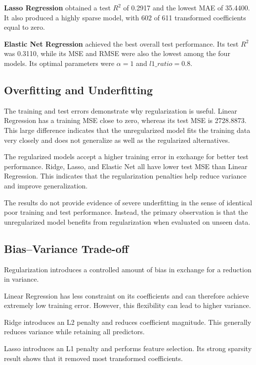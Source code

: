 \documentclass[12pt,a4paper]{article}
\begin{document}
\textbf{Lasso Regression} obtained a test $R^2$ of 0.2917 and the lowest MAE of 35.4400. It also produced a highly sparse model, with 602 of 611 transformed coefficients equal to zero.

\textbf{Elastic Net Regression} achieved the best overall test performance. Its test $R^2$ was 0.3110, while its MSE and RMSE were also the lowest among the four models. Its optimal parameters were $\alpha=1$ and $l1\_ratio=0.8$.

\subsection{Overfitting and Underfitting}

The training and test errors demonstrate why regularization is useful. Linear Regression has a training MSE close to zero, whereas its test MSE is 2728.8873. This large difference indicates that the unregularized model fits the training data very closely and does not generalize as well as the regularized alternatives.

The regularized models accept a higher training error in exchange for better test performance. Ridge, Lasso, and Elastic Net all have lower test MSE than Linear Regression. This indicates that the regularization penalties help reduce variance and improve generalization.

The results do not provide evidence of severe underfitting in the sense of identical poor training and test performance. Instead, the primary observation is that the unregularized model benefits from regularization when evaluated on unseen data.

\subsection{Bias--Variance Trade-off}

Regularization introduces a controlled amount of bias in exchange for a reduction in variance.

Linear Regression has less constraint on its coefficients and can therefore achieve extremely low training error. However, this flexibility can lead to higher variance.

Ridge introduces an L2 penalty and reduces coefficient magnitude. This generally reduces variance while retaining all predictors.

Lasso introduces an L1 penalty and performs feature selection. Its strong sparsity result shows that it removed most transformed coefficients.
\end{document}
